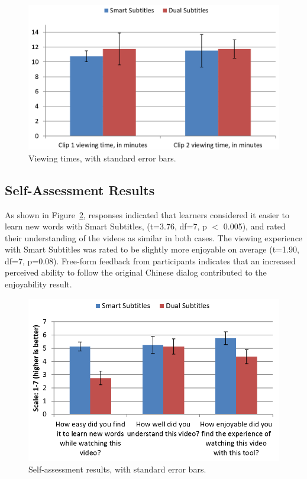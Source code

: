 \documentclass{sigchi}
\begin{document}
\begin{figure}[!h]
\centering
\includegraphics[width=\columnwidth]{viewing-times}
\caption{Viewing times, with standard error bars.}
\label{fig:figure7}
\end{figure}


\subsection{Self-Assessment Results}

As shown in Figure~\ref{fig:figure8}, responses indicated that learners considered it easier to learn new words with Smart Subtitles, (t=3.76, df=7, p $<$ 0.005), and rated their understanding of the videos as similar in both cases. The viewing experience with Smart Subtitles was rated to be slightly more enjoyable on average (t=1.90, df=7, p=0.08). Free-form feedback from participants indicates that an increased perceived ability to follow the original Chinese dialog contributed to the enjoyability result.

\begin{figure}[!h]
\centering
\includegraphics[width=\columnwidth]{self-assessment-results}
\caption{Self-assessment results, with standard error bars.}
\label{fig:figure8}
\end{figure}
\end{document}
